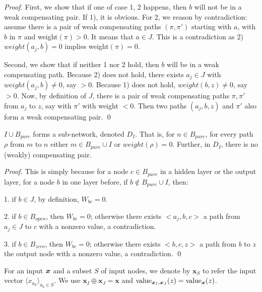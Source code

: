 			\begin{proof}
				First, we show that if one of case 1, 2 happens, then $b$ will not be in a weak compensating pair. If 1), it is obvious. For 2, we reason by contradiction: assume there is a pair of weak compensating paths 	$(\pi,\pi')$ starting with $a$, with $b$ in $\pi$ and weight$(\pi) > 0$. It means that $a \in J$. This is a contradiction as 2) $weight({a_j,b})=0$ implies weight$(\pi)=0$.
				
				Second, we show that if neither 1 nor 2 hold, then $b$ will be in a weak compensating path.
				Because 2) does not hold, there exists $a_j \in J$ with $weight({a_j,b}) \neq 0$, say $>0$.
				Because 1) does not hold, $weight({b,z}) \neq 0$, say $>0$.
				Now, by definition of $J$, there is a pair of weak compensating paths $\pi,\pi'$ 
				from $a_j$ to $z$, say with $\pi'$ with weight $<0$.
				Then two paths $(a_j,b,z)$ and $\pi'$ also form a weak compensating pair. \qed
			\end{proof}
			
			\begin{lemma}\label{lem:subnetwork}
				$I \cup B_{pure} $ forms a sub-network, denoted $D_I$. That is, 
				for $n \in B_{pure}$, for every path $\rho$ from $m$ to $n$
				either $m \in B_{pure}\cup I$ or $weight(\rho)=0$.
				Further, in $D_I$, there is no (weakly) compensating pair.
			\end{lemma}

			

			
			\begin{proof}
				This is simply because for a node $c\in B_{pure}$ in a hidden layer or the output layer, for a node $b$ in one layer before, if $b\notin B_{pure}\cup I$, then:
				
				1. if $b\in J$, by definition, $W_{bc}=0$.
				
				2. if $b\in B_{open}$, then $W_{bc}=0$; otherwise there exists $<a_j,b,c>$ a path from $a_j\in J$ to $c$ with a nonzero value, a contradiction.
				
				3. if $b\in B_{zero}$, then $W_{bc}=0$; otherwise there exists $<b,c,z>$ a path from $b$ to $z$ the output node with a nonzero value, a contradiction. \qed
			\end{proof}
			
			
			
			For an input $\boldsymbol{x}$ and a subset $S$ of input nodes, we denote by 
			$\boldsymbol{x}_S$ to refer the input vector $\langle x_{a_k}\rangle_{a_k\in S}$. We use $\boldsymbol{x}_I\oplus \boldsymbol{x}_J = \boldsymbol{x}$ and 
			${\textrm{value}}_{\boldsymbol{x}_I,\boldsymbol{x}_J} (z)={\textrm{value}}_{\boldsymbol{x}}(z)$. 
			
